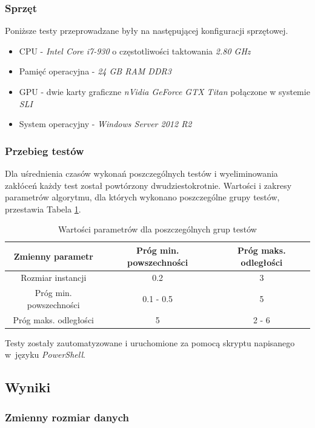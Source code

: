 \documentclass[12pt]{article}
\begin{document}
\subsubsection{Sprzęt}

Poniższe testy przeprowadzane były na następującej konfiguracji sprzętowej. 

\begin{itemize}
\item CPU - \textit{Intel Core i7-930} o częstotliwości taktowania \textit{2.80 GHz}
\item Pamięć operacyjna - \textit{24 GB RAM DDR3}
\item GPU - dwie karty graficzne \textit{nVidia GeForce GTX Titan} połączone w systemie \textit{SLI}
\item System operacyjny - \textit{Windows Server 2012 R2}
\end{itemize}

\subsubsection{Przebieg testów}

Dla uśrednienia czasów wykonań poszczególnych testów i wyeliminowania zakłóceń każdy test został powtórzony dwudziestokrotnie. Wartości i zakresy parametrów algorytmu, dla których wykonano poszczególne grupy testów, przestawia Tabela \ref{tab:params}.

\begin{table}[h!]
\centering
\begin{tabular}{|c|c|c|}
\hline
\textbf{Zmienny parametr} & \textbf{Próg min. powszechności} & \textbf{Próg maks. odległości} \\
\hline
Rozmiar instancji & 0.2 & 3 \\
Próg min. powszechności & 0.1 - 0.5 & 5 \\
Próg maks. odległości & 5 & 2 - 6 \\
\hline
\end{tabular}
\caption{Wartości parametrów dla poszczególnych grup testów}
\label{tab:params}
\end{table}

Testy zostały zautomatyzowane i uruchomione za pomocą skryptu napisanego w~języku \textit{PowerShell}.

\subsection{Wyniki}

\subsubsection{Zmienny rozmiar danych}
\end{document}
